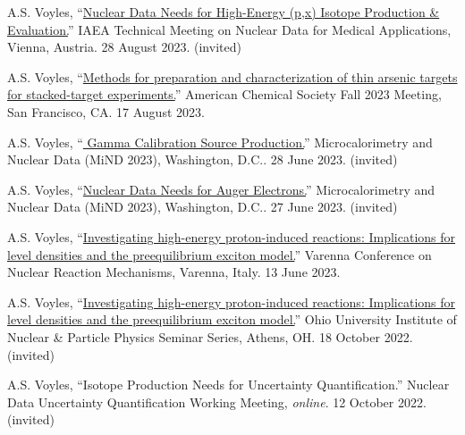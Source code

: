 \begin{bibsection}

\item A.S. Voyles, \enquote{\href{}{Nuclear Data Needs for High-Energy (p,x) Isotope Production \& Evaluation.}} IAEA Technical Meeting on Nuclear Data for Medical Applications, Vienna, Austria. 28 August 2023. (invited) 

\item A.S. Voyles, \enquote{\href{https://acs.digitellinc.com/sessions/583121/view}{Methods for preparation and characterization of thin arsenic targets for stacked-target experiments.}} American Chemical Society Fall 2023 Meeting, San Francisco, CA. 17 August 2023. 

\item A.S. Voyles, \enquote{\href{https://conferences.lbl.gov/event/1243/contributions/7407/}{ Gamma Calibration Source Production.}} Microcalorimetry and Nuclear Data (MiND 2023), Washington, D.C.. 28 June 2023. (invited)

\item A.S. Voyles, \enquote{\href{https://conferences.lbl.gov/event/1243/contributions/7398/}{Nuclear Data Needs for Auger
Electrons.}} Microcalorimetry and Nuclear Data (MiND 2023), Washington, D.C.. 27 June 2023. (invited)

\item A.S. Voyles, \enquote{\href{https://indico.cern.ch/event/1132769/contributions/5395295/}{Investigating high-energy proton-induced reactions: Implications for level densities and the preequilibrium exciton model.}}  Varenna Conference on Nuclear Reaction Mechanisms, Varenna, Italy. 13 June 2023. 

\item A.S. Voyles, \enquote{\href{https://inpp.ohio.edu/~inpp/seminars/abstracts_fall2022/INPP_18Oct22.pdf}{Investigating high-energy proton-induced reactions: Implications for level densities and the preequilibrium exciton model.}} Ohio University Institute of Nuclear \& Particle Physics Seminar Series, Athens, OH. 18 October 2022. (invited)

\item A.S. Voyles, \enquote{Isotope Production Needs for Uncertainty Quantification.} Nuclear Data Uncertainty Quantification Working Meeting, \emph{online}. 12 October 2022. (invited)


\end{bibsection}
